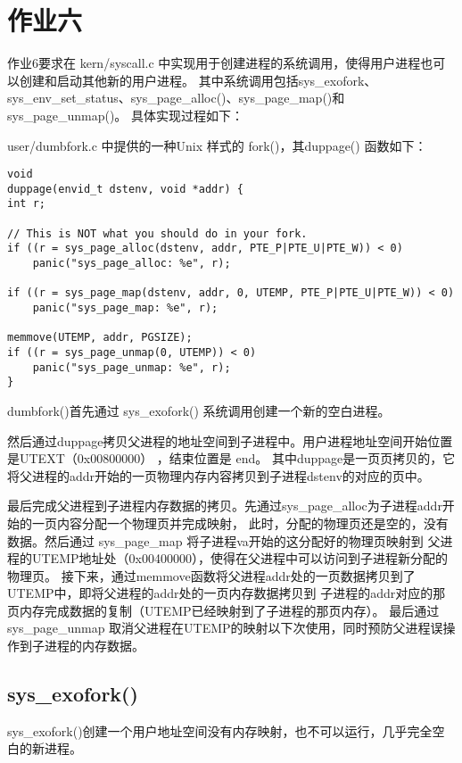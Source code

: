 \documentclass[12pt,a4paper]{article}
\begin{document}
\section{作业六}

    作业6要求在 kern/syscall.c 中实现用于创建进程的系统调用，使得用户进程也可以创建和启动其他新的用户进程。
    其中系统调用包括sys\_exofork、sys\_env\_set\_status、sys\_page\_alloc()、sys\_page\_map()和sys\_page\_unmap()。
    具体实现过程如下：

    user/dumbfork.c 中提供的一种Unix 样式的 fork()，其duppage() 函数如下：
    \begin{lstlisting}[style=CPP]
void
duppage(envid_t dstenv, void *addr) {
int r;

// This is NOT what you should do in your fork.
if ((r = sys_page_alloc(dstenv, addr, PTE_P|PTE_U|PTE_W)) < 0)
    panic("sys_page_alloc: %e", r);
    
if ((r = sys_page_map(dstenv, addr, 0, UTEMP, PTE_P|PTE_U|PTE_W)) < 0)
    panic("sys_page_map: %e", r);
    
memmove(UTEMP, addr, PGSIZE);
if ((r = sys_page_unmap(0, UTEMP)) < 0)
    panic("sys_page_unmap: %e", r);
}
    \end{lstlisting}

    dumbfork()首先通过 sys\_exofork() 系统调用创建一个新的空白进程。

    然后通过duppage拷贝父进程的地址空间到子进程中。用户进程地址空间开始位置是UTEXT（0x00800000） ，结束位置是 end。
    其中duppage是一页页拷贝的，它将父进程的addr开始的一页物理内存内容拷贝到子进程dstenv的对应的页中。

    最后完成父进程到子进程内存数据的拷贝。先通过sys\_page\_alloc为子进程addr开始的一页内容分配一个物理页并完成映射，
    此时，分配的物理页还是空的，没有数据。然后通过 sys\_page\_map 将子进程va开始的这分配好的物理页映射到
    父进程的UTEMP地址处（0x00400000），使得在父进程中可以访问到子进程新分配的物理页。
    接下来，通过memmove函数将父进程addr处的一页数据拷贝到了UTEMP中，即将父进程的addr处的一页内存数据拷贝到
    子进程的addr对应的那页内存完成数据的复制（UTEMP已经映射到了子进程的那页内存）。
    最后通过 sys\_page\_unmap 取消父进程在UTEMP的映射以下次使用，同时预防父进程误操作到子进程的内存数据。

    \subsection{sys\_exofork()}
    sys\_exofork()创建一个用户地址空间没有内存映射，也不可以运行，几乎完全空白的新进程。
\end{document}
